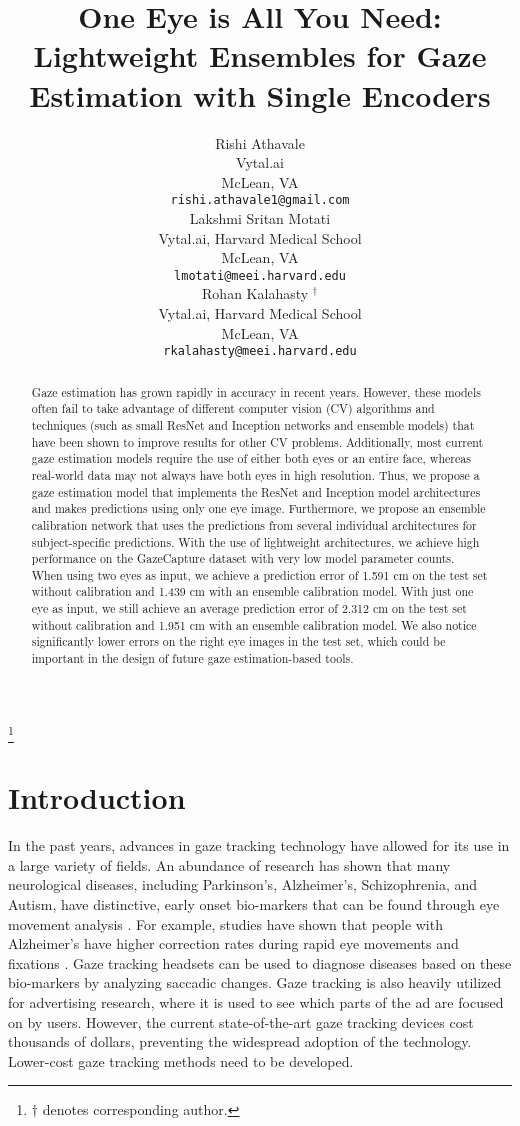\documentclass{article}
\title{One Eye is All You Need: Lightweight Ensembles for Gaze Estimation with Single Encoders}
\author{Rishi Athavale \\
  Vytal.ai \\
  McLean, VA \\
  \texttt{rishi.athavale1@gmail.com} \\
  \And
  Lakshmi Sritan Motati \\
  Vytal.ai, Harvard Medical School\\
  McLean, VA \\
  \texttt{lmotati@meei.harvard.edu} \\
  \And
  Rohan Kalahasty \Envelope \hspace{1pt} $^{ \dagger}$\\ 
  Vytal.ai, Harvard Medical School \\
  McLean, VA \\
  \texttt{rkalahasty@meei.harvard.edu} \\
}
\newcommand\blfootnote[1]{\begingroup
  \renewcommand\thefootnote{}\footnote{#1}\addtocounter{footnote}{-1}\endgroup
}
\begin{document}
\maketitle
\blfootnote{$\dagger$ denotes corresponding author.}

\begin{abstract}
    Gaze estimation has grown rapidly in accuracy in recent years. However, these models often fail to take advantage of different computer vision (CV) algorithms and techniques (such as small ResNet and Inception networks and ensemble models) that have been shown to improve results for other CV problems. Additionally, most current gaze estimation models require the use of either both eyes or an entire face, whereas real-world data may not always have both eyes in high resolution. Thus, we propose a gaze estimation model that implements the ResNet and Inception model architectures and makes predictions using only one eye image. Furthermore, we propose an ensemble calibration network that uses the predictions from several individual architectures for subject-specific predictions. With the use of lightweight architectures, we achieve high performance on the GazeCapture dataset with very low model parameter counts. When using two eyes as input, we achieve a prediction error of 1.591 cm on the test set without calibration and 1.439 cm with an ensemble calibration model. With just one eye as input, we still achieve an average prediction error of 2.312 cm on the test set without calibration and 1.951 cm with an ensemble calibration model. We also notice significantly lower errors on the right eye images in the test set, which could be important in the design of future gaze estimation-based tools.
\end{abstract}

\section{Introduction}
In the past years, advances in gaze tracking technology have allowed for its use in a large variety of fields. An abundance of research has shown that many neurological diseases, including Parkinson's, Alzheimer's, Schizophrenia, and Autism, have distinctive, early onset bio-markers that can be found through eye movement analysis \cite{mao_he_liu_chen_2020}. For example, studies have shown that people with Alzheimer's have higher correction rates during rapid eye movements and fixations \cite{opwonya_doan_kim_kim_ku_kim_park_kim_2021}. Gaze tracking headsets can be used to diagnose diseases based on these bio-markers by analyzing saccadic changes. Gaze tracking is also heavily utilized for advertising research, where it is used to see which parts of the ad are focused on by users. However, the current state-of-the-art gaze tracking devices cost thousands of dollars, preventing the widespread adoption of the technology. Lower-cost gaze tracking methods need to be developed.
\end{document}
